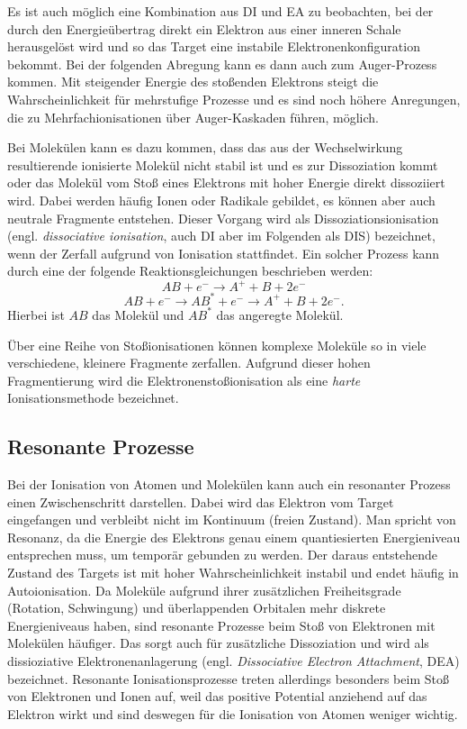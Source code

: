 Es ist auch möglich eine Kombination aus DI und EA zu beobachten, bei der durch den Energieübertrag direkt ein Elektron aus einer inneren Schale herausgelöst wird und so das Target eine instabile Elektronenkonfiguration bekommt. Bei der folgenden Abregung kann es dann auch zum Auger-Prozess kommen. Mit steigender Energie des stoßenden Elektrons steigt die Wahrscheinlichkeit für mehrstufige Prozesse und es sind noch höhere Anregungen, die zu Mehrfachionisationen über Auger-Kaskaden führen, möglich.

Bei Molekülen kann es dazu kommen, dass das aus der Wechselwirkung resultierende ionisierte Molekül nicht stabil ist und es zur Dissoziation kommt oder das Molekül vom Stoß eines Elektrons mit hoher Energie direkt dissoziiert wird. Dabei werden häufig Ionen oder Radikale gebildet, es können aber auch neutrale Fragmente entstehen. Dieser Vorgang wird als Dissoziationsionisation (engl. \textit{dissociative ionisation}, auch DI aber im Folgenden als DIS) bezeichnet, wenn der Zerfall aufgrund von Ionisation stattfindet. Ein solcher Prozess kann durch eine der folgende Reaktionsgleichungen beschrieben werden:
\begin{equation}
    AB + e^- \rightarrow A^{+} + B + 2e^-
\end{equation}
\begin{equation}
    AB + e^- \rightarrow AB^* + e^- \rightarrow A^{+} + B + 2e^-.
\end{equation} 
Hierbei ist $AB$ das Molekül und $AB^*$ das angeregte Molekül.

Über eine Reihe von Stoßionisationen können komplexe Moleküle so in viele verschiedene, kleinere Fragmente zerfallen. Aufgrund dieser hohen Fragmentierung wird die Elektronenstoßionisation als eine \textit{harte} Ionisationsmethode bezeichnet.

\subsection{Resonante Prozesse}
Bei der Ionisation von Atomen und Molekülen kann auch ein resonanter Prozess einen Zwischenschritt darstellen. Dabei wird das Elektron vom Target eingefangen und verbleibt nicht im Kontinuum (freien Zustand). Man spricht von Resonanz, da die Energie des Elektrons genau einem quantiesierten Energieniveau entsprechen muss, um temporär gebunden zu werden. Der daraus entstehende Zustand des Targets ist mit hoher Wahrscheinlichkeit instabil und endet häufig in Autoionisation. Da Moleküle aufgrund ihrer zusätzlichen Freiheitsgrade (Rotation, Schwingung) und überlappenden Orbitalen mehr diskrete Energieniveaus haben, sind resonante Prozesse beim Stoß von Elektronen mit Molekülen häufiger. Das sorgt auch für zusätzliche Dissoziation und wird als dissioziative Elektronenanlagerung (engl. \textit{Dissociative Electron Attachment}, DEA) bezeichnet. Resonante Ionisationsprozesse treten allerdings besonders beim Stoß von Elektronen und Ionen auf, weil das positive Potential anziehend auf das Elektron wirkt und sind deswegen für die Ionisation von Atomen weniger wichtig.

